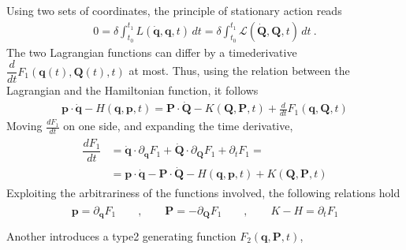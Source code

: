 \documentclass[letterpaper,10pt,english]{jupyterBook}
\begin{document}
\sphinxAtStartPar
Using two sets of coordinates, the principle of stationary action reads
\begin{equation*}
\begin{split}0 = \delta \int_{t_0}^{t_1} L(\dot{\mathbf{q}}, \mathbf{q},t) \, dt = \delta \int_{t_0}^{t_1} \mathcal{L}(\dot{\mathbf{Q}}, \mathbf{Q},t) \, dt \ .\end{split}
\end{equation*}
\sphinxAtStartPar
The two Lagrangian functions can differ by a time\sphinxhyphen{}derivative \(\dfrac{d}{dt} F_{1}(\mathbf{q}(t), \mathbf{Q}(t),t)\) at most. Thus, using the relation between the Lagrangian and the Hamiltonian function, it follows
\begin{equation*}
\begin{split}\mathbf{p} \cdot \dot{\mathbf{q}} - H(\mathbf{q},\mathbf{p},t) = \mathbf{P} \cdot \dot{\mathbf{Q}} - K(\mathbf{Q}, \mathbf{P}, t) + \frac{d}{dt} F_1(\mathbf{q}, \mathbf{Q},t)\end{split}
\end{equation*}
\sphinxAtStartPar
Moving \( \frac{d F_1}{dt}\) on one side, and expanding the time derivative,
\begin{equation*}
\begin{split}\begin{aligned}
  \dfrac{d F_1}{dt}
  & = \dot{\mathbf{q}} \cdot \partial_{\mathbf{q}} F_1 + \dot{\mathbf{Q}} \cdot \partial_{\mathbf{Q}} F_1 + \partial_t F_1 = \\
  & = \mathbf{p} \cdot \dot{\mathbf{q}} - \mathbf{P} \cdot \dot{\mathbf{Q}} - H(\mathbf{q},\mathbf{p},t) + K(\mathbf{Q}, \mathbf{P}, t)
\end{aligned}\end{split}
\end{equation*}
\sphinxAtStartPar
Exploiting the arbitrariness of the functions involved, the following relations hold
\begin{equation*}
\begin{split}\begin{aligned}
  \mathbf{p} = \partial_{\mathbf{q}} F_1 \qquad , \qquad
  \mathbf{P} =-\partial_{\mathbf{Q}} F_1 \qquad , \qquad
  K - H      = \partial_{t} F_1 \\
\end{aligned}\end{split}
\end{equation*}
\sphinxAtStartPar
Another  introduces a type\sphinxhyphen{}2 generating function \(F_2(\mathbf{q}, \mathbf{P}, t)\),
\end{document}
